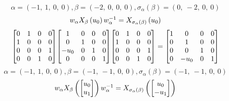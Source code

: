 \documentclass[11pt]{article}
\theoremstyle{definition}
\begin{document}
\[
\alpha = \left( -1, \  1, \  0, \  0\right), \beta = \left( -2, \  0, \  0, \  0\right), \sigma_{\alpha}(\beta) = \left( 0, \  -2, \  0, \  0\right)
\]
\[
\scaletoalign{\textwidth}{w_{\alpha} X_{\beta}\left(u_{0}\right) w_{\alpha}^{-1} = X_{\sigma_{\alpha}\left(\beta\right)}\left(u_{0}\right)}
\]
\[
\scaletoalign{\textwidth}{{\left[\begin{matrix}0 & 1 & 0 & 0\\1 & 0 & 0 & 0\\0 & 0 & 0 & 1\\0 & 0 & 1 & 0\end{matrix}\right]} {\left[\begin{matrix}1 & 0 & 0 & 0\\0 & 1 & 0 & 0\\- u_{0} & 0 & 1 & 0\\0 & 0 & 0 & 1\end{matrix}\right]} {\left[\begin{matrix}0 & 1 & 0 & 0\\1 & 0 & 0 & 0\\0 & 0 & 0 & 1\\0 & 0 & 1 & 0\end{matrix}\right]} = {\left[\begin{matrix}1 & 0 & 0 & 0\\0 & 1 & 0 & 0\\0 & 0 & 1 & 0\\0 & - u_{0} & 0 & 1\end{matrix}\right]}}
\]
\[
\alpha = \left( -1, \  1, \  0, \  0\right), \beta = \left( -1, \  -1, \  0, \  0\right), \sigma_{\alpha}(\beta) = \left( -1, \  -1, \  0, \  0\right)
\]
\[
\scaletoalign{\textwidth}{w_{\alpha} X_{\beta}\left(\left[\begin{matrix}u_{0}\\u_{1}\end{matrix}\right]\right) w_{\alpha}^{-1} = X_{\sigma_{\alpha}\left(\beta\right)}\left(\left[\begin{matrix}u_{0}\\- u_{1}\end{matrix}\right]\right)}
\]
\end{document}
